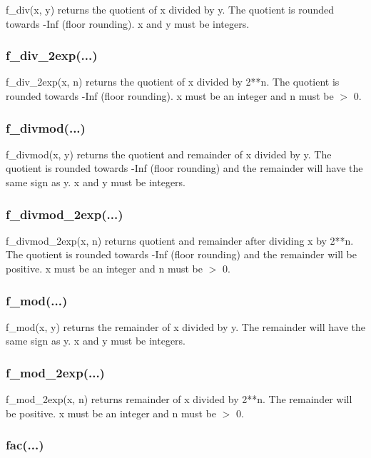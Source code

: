 f\_div(x, y) returns the quotient of x divided by y. The quotient is rounded towards -Inf (floor
rounding). x and y must be integers.

\subsubsection{f\_div\_2exp(...)}

f\_div\_2exp(x, n) returns the quotient of x divided by 2**n. The quotient is rounded towards -Inf
(floor rounding). x must be an integer and n must be $>$ 0.

\subsubsection{f\_divmod(...)}

f\_divmod(x, y) returns the quotient and remainder of x divided by y. The quotient is rounded
towards -Inf (floor rounding) and the remainder will have the same sign as y. x and y must be
integers.

\subsubsection{f\_divmod\_2exp(...)}

f\_divmod\_2exp(x, n) returns quotient and remainder after dividing x by 2**n. The quotient is
rounded towards -Inf (floor rounding) and the remainder will be positive. x must be an integer
and n must be $>$ 0.

\subsubsection{f\_mod(...)}

f\_mod(x, y) returns the remainder of x divided by y. The remainder will have the same sign as
y. x and y must be integers.

\subsubsection{f\_mod\_2exp(...)}

f\_mod\_2exp(x, n) returns remainder of x divided by 2**n. The remainder will be positive. x must
be an integer and n must be $>$ 0.

\subsubsection{fac(...)}

